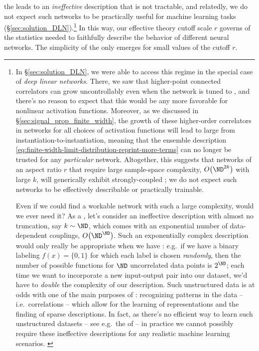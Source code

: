 the  leads to an \emph{ineffective} description that is not tractable, and relatedly, we do not expect such networks to be practically useful for machine learning tasks (\S\ref{sec:solution_DLN}).\footnote{
In \S\ref{sec:solution_DLN}, we were able to access this regime in the special case of \emph{deep linear networks}. There, we saw that 
higher-point connected correlators can grow uncontrollably even when the network is tuned to , and there's no reason to expect that this would be any more favorable for nonlinear activation functions.
Moreover, as we discussed in \S\ref{sec:signal_prop_finite_width}, the growth of these higher-order correlators in networks for all choices of activation functions will lead to large   from instantiation-to-instantiation, meaning that the ensemble description \eqref{eq:finite-width-limit-distribution-reprint-more-terms} can no longer be trusted for any \emph{particular} network.
Altogether, this suggests that networks of an aspect ratio $r$ that require large sample-space complexity, $O\big(\ND^{2k}\big)$ with large $k$, will generically exhibit strongly-coupled ; we do not expect such networks  to be 
effectively describable or practically trainable.

Even if we could find a workable network with such a large complexity, would we ever need it?
As a ,
let's consider an ineffective description with almost no truncation, say $k\sim \ND$, which comes with an exponential number of data-dependent couplings, $O\big(\ND^{\ND}\big)$.
Such an exponentially complex description would  only really be appropriate when we have : e.g.~if we have a binary labeling $f(x) = \{0,1\}$ for which each label is chosen \emph{randomly}, then the number of possible functions for $\ND$ uncorrelated data points is $2^{\ND}$; each time we want to incorporate a new input-output pair into our dataset, we'd have to \emph{double} the complexity of our description.
Such unstructured data is at odds with one of the main purposes of : recognizing patterns in the data -- i.e.~correlations -- which allow for the learning of representations and the finding of sparse descriptions. In fact, as there's no efficient way to learn such unstructured datasets -- see e.g.~the  of \cite{wolpert1996lack,wolpert1997no} -- in practice we cannot possibly require these ineffective descriptions
for any realistic machine learning scenarios.
\label{footnote:epilogue-chaos}
}
\ei
In this way, our effective theory cutoff scale $r$ governs  of the statistics needed to faithfully describe the behavior of different neural networks. The simplicity of the  only emerges for small values of the cutoff $r$.


















